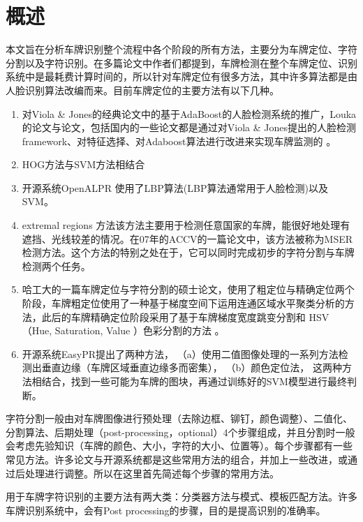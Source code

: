 \section{概述}
本文旨在分析车牌识别整个流程中各个阶段的所有方法，主要分为车牌定位、字符分割以及字符识别。在多篇论文中作者们都提到，车牌检测在整个车牌定位、识别系统中是最耗费计算时间的，所以针对车牌定位有很多方法，其中许多算法都是由人脸识别算法改编而来。目前车牌定位的主要方法有以下几种。
\begin{enumerate}
\item
对Viola \& Jones的经典论文\cite{rrt_face_detection}中的基于AdaBoost的人脸检测系统的推广，Louka的论文\cite{plate_dection_using_adaboost}与论文\cite{rtl_plate_recoginition_on_edsp}，包括国内的一些论文都是通过对Viola \& Jones提出的人脸检测framework、对特征选择、对Adaboost算法进行改进来实现车牌监测的 。
\item
HOG方法与SVM方法相结合
\item
开源系统OpenALPR 使用了LBP算法(LBP算法通常用于人脸检测)以及SVM。
\item
extremal regions 方法\cite{un_lic_plate_and_text}该方法主要用于检测任意国家的车牌，能很好地处理有遮挡、光线较差的情况。在07年的ACCV的一篇论文中，该方法被称为MSER\cite{mser}检测方法。这个方法的特别之处在于，它可以同时完成初步的字符分割与车牌检测两个任务。
\item
哈工大的一篇车牌定位与字符分割的硕士论文\cite{ysy_natrue}，使用了粗定位与精确定位两个阶段，车牌粗定位使用了一种基于梯度空间下运用连通区域水平聚类分析的方法，此后的车牌精确定位阶段采用了基于车牌梯度宽度跳变分割和 HSV（Hue, Saturation, Value ）色彩分割的方法 。
\item
开源系统EasyPR提出了两种方法，
（a）使用二值图像处理的一系列方法检测出垂直边缘（车牌区域垂直边缘多而密集），
（b）颜色定位法，
这两种方法相结合，找到一些可能为车牌的图块，再通过训练好的SVM模型进行最终判断。
\end{enumerate}

字符分割一般由对车牌图像进行预处理（去除边框、铆钉，颜色调整）、二值化、分割算法、后期处理（post-processing，optional）4个步骤组成，并且分割时一般会考虑先验知识（车牌的颜色、大小，字符的大小、位置等）。每个步骤都有一些常见方法。许多论文与开源系统都是这些常用方法的组合，并加上一些改进，或通过后处理进行调整。所以在这里首先简述每个步骤的常用方法。

用于车牌字符识别的主要方法有两大类：分类器方法与模式、模板匹配方法。许多车牌识别系统中，会有Post processing的步骤，目的是提高识别的准确率。